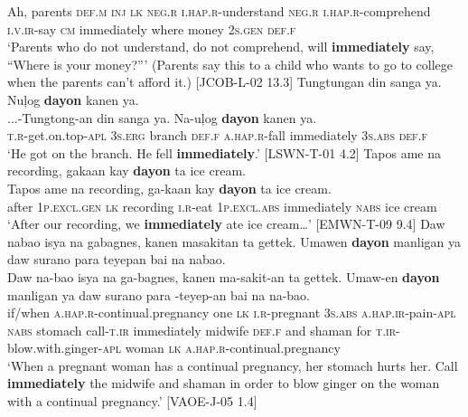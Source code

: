 Ah,  parents  \textsc{def.m}  \textsc{inj}  \textsc{lk}  \textsc{neg.r}  \textsc{i.hap.r}-understand  \textsc{neg.r}
\textsc{i.hap.r}-comprehend  \textsc{i.v.ir}-say  \textsc{cm}  immediately  where  money  2\textsc{s.gen}  \textsc{def.f} \\
\glt `Parents who do not understand, do not comprehend, will \textbf{immediately} say, “Where is your money?”' (Parents say this to a child who wants to go to college when the parents can’t afford it.) [JCOB-L-02 13.3]
\z
\ea
Tungtungan  din  sanga  ya.  Nuļog  \textbf{dayon}  kanen ya. \\\smallskip
 \gll ...-Tungtong-an  din  sanga  ya.  Na-uļog  \textbf{dayon}  kanen ya. \\
\textsc{t.r}-get.on.top-\textsc{apl}  3\textsc{s.erg}  branch  \textsc{def.f}  \textsc{a.hap.r}-fall  immediately  3\textsc{s.abs} \textsc{def.f} \\
\glt ‘He got on the branch. He fell \textbf{immediately}.’ [LSWN-T-01 4.2]
\z
\ea
Tapos  ame  na  recording,  gakaan  kay  \textbf{dayon} ta  ice cream. \\\smallskip
 \gll Tapos  ame  na  recording,  ga-kaan  kay  \textbf{dayon} ta  ice cream. \\
after  1\textsc{p.excl.gen}  \textsc{lk}  recording  \textsc{i.r}-eat  1\textsc{p.excl.abs}  immediately
\textsc{nabs}  ice cream \\
\glt ‘After our recording, we \textbf{immediately} ate ice cream…’ [EMWN-T-09 9.4]
\z
\ea
\label{bkm:Ref425607965}
Daw  nabao  isya  na  gabagnes,  kanen masakitan  ta  gettek.  Umawen  \textbf{dayon} manligan  ya  daw  surano  para  teyepan bai na  nabao. \\\smallskip
\gll Daw  na-bao  isya  na  ga-bagnes,  kanen ma-sakit-an  ta  gettek.  Umaw-en  \textbf{dayon} manligan  ya  daw  surano  para  \emptyset{}-teyep-an\footnotemark{} bai na  na-bao. \\
if/when  \textsc{a.hap.r}-continual.pregnancy  one  \textsc{lk}  \textsc{i.r}-pregnant  3\textsc{s.abs}
\textsc{a.hap.ir}-pain-\textsc{apl}  \textsc{nabs}  stomach  call-\textsc{t.ir}  immediately
midwife  \textsc{def.f}  and  shaman  for  \textsc{t.ir}-blow.with.ginger-\textsc{apl}  woman
\textsc{lk} \textsc{a.hap.r}-continual.pregnancy \\
\newpage
\glt `When a pregnant woman has a continual pregnancy, her stomach hurts her. Call \textbf{immediately} the midwife and shaman in order to blow ginger on the woman with a continual pregnancy.’ [VAOE-J-05 1.4]
\z

